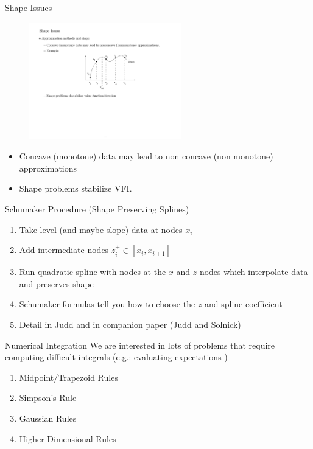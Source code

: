\documentclass[xcolor=pdftex,dvipsnames,table,mathserif]{beamer}
\begin{document}
\begin{frame}{Shape Issues}
\begin{figure}[htbp]
\begin{center}
\includegraphics[height=2in]{spline.pdf}
\label{default}
\end{center}
\end{figure}
\begin{itemize}
\item Concave (monotone) data may lead to non concave (non monotone) approximations
\item Shape problems stabilize VFI.
\end{itemize}
\end{frame}

\begin{frame}{Schumaker Procedure (Shape Preserving Splines)}
\begin{enumerate}
\item Take level (and maybe slope) data at nodes $x_i$
\item Add intermediate nodes $z_i^{+} \in [x_i,x_{i+1}]$
\item Run quadratic spline with nodes at the $x$ and $z$ nodes which interpolate data and preserves shape
\item Schumaker formulas tell you how to choose the $z$ and spline coefficient
\item Detail in Judd and in companion paper (Judd and Solnick)
\end{enumerate}
\end{frame}


\begin{frame}{Numerical Integration}
We are interested in lots of problems that require computing difficult integrals (e.g.: evaluating expectations )
\begin{enumerate}
\item Midpoint/Trapezoid Rules
\item Simpson's Rule
\item Gaussian Rules
\item Higher-Dimensional Rules
\end{enumerate}
\end{frame}
\end{document}
